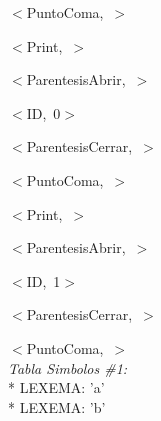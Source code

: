 \documentclass[a4paper, 12pt]{article}
\begin{document}
 
 \mbox{$<$PuntoComa, $>$ }
 
 
 \mbox{$<$Print, $>$ }
 
 
 \mbox{$<$ParentesisAbrir, $>$ }
 
 
 \mbox{$<$ID, 0$>$ }
 
 
 \mbox{$<$ParentesisCerrar, $>$ }
 
 
 \mbox{$<$PuntoComa, $>$ }
 
 
 \mbox{$<$Print, $>$ }
 
 
 \mbox{$<$ParentesisAbrir, $>$ }
 
 
 \mbox{$<$ID, 1$>$ }
 
 
 \mbox{$<$ParentesisCerrar, $>$ }
 
 
 \mbox{$<$PuntoComa, $>$}\medskip\\
\emph{Tabla Simbolos \#1:}\\ 
\mbox{*} LEXEMA: 'a'\\
\mbox{*} LEXEMA: 'b' 
\end{document}
